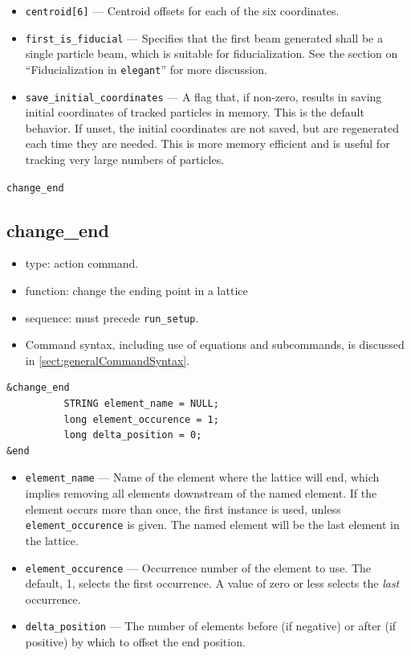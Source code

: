 \documentclass[11pt]{article}
\begin{document}
\begin{itemize}
\item \verb|centroid[6]| --- Centroid offsets for each of the six coordinates.

\item \verb|first_is_fiducial| --- Specifies that the first beam
generated shall be a single particle beam, which is suitable for
fiducialization.  See the section on ``Fiducialization in
\verb|elegant|'' for more discussion.

\item \verb|save_initial_coordinates| --- A flag that, if non-zero, results
in saving initial coordinates of tracked particles in memory.  This is
the default behavior.  If unset, the initial coordinates are not
saved, but are regenerated each time they are needed.  This is more
memory efficient and is useful for tracking very large numbers of
particles.
\end{itemize}

\newpage
\begin{center}{\Large\verb|change_end|}\end{center}
\subsection{change\_end\label{subsec:changeend}}

\begin{itemize}
\item type: action command.
\item function: change the ending point in a lattice
\item sequence: must precede \verb|run_setup|.
\item Command syntax, including use of equations and subcommands, is discussed in \ref{sect:generalCommandSyntax}.
\end{itemize}

\begin{verbatim}
&change_end
          STRING element_name = NULL;
          long element_occurence = 1;
          long delta_position = 0;
&end
\end{verbatim}

\begin{itemize}
\item \verb|element_name| --- Name of the element where the lattice will end, which implies removing all 
  elements downstream of the named element. If the element occurs more than once, the first instance is used, unless
  \verb|element_occurence| is given. The named element will be the last element in the lattice.
\item \verb|element_occurence| --- Occurrence number of the element to use. The default, 1, selects the first
  occurrence. A value of zero or less selects the \emph{last} occurrence.
\item \verb|delta_position| --- The number of elements before (if negative) or after (if positive) by which to
  offset the end position.
\end{itemize}
\end{document}
